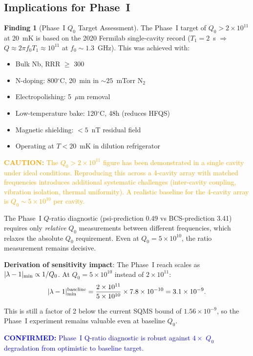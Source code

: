 \documentclass[11pt]{article}
\theoremstyle{definition}
\newtheorem{finding}[theorem]{Finding}
\theoremstyle{remark}
\newcommand{\ee}[1]{\times 10^{#1}}
\newcommand{\lam}{|\lambda-1|}
\newcommand{\confirmed}[1]{\textcolor{blue}{\textbf{CONFIRMED:} #1}}
\newcommand{\caution}[1]{\textcolor{orange}{\textbf{CAUTION:} #1}}
\begin{document}
\subsection{Implications for Phase~I}

\begin{finding}[Phase~I $Q_0$ Target Assessment]
\label{find:q0_target}
The Phase~I target of $Q_0 > 2\ee{11}$ at 20~mK is based on the
2020 Fermilab single-cavity record ($T_1 = 2$~s $\Rightarrow$
$Q \approx 2\pi f_0 T_1 \approx 10^{11}$ at $f_0 \sim 1.3$~GHz).
This was achieved with:
\begin{itemize}[nosep]
\item Bulk Nb, RRR $\geq$ 300
\item N-doping: 800$^\circ$C, 20~min in $\sim 25$~mTorr N$_2$
\item Electropolishing: 5~$\mu$m removal
\item Low-temperature bake: 120$^\circ$C, 48h (reduces HFQS)
\item Magnetic shielding: $< 5$~nT residual field
\item Operating at $T < 20$~mK in dilution refrigerator
\end{itemize}

\caution{The $Q_0 > 2\ee{11}$ figure has been demonstrated in a
single cavity under ideal conditions. Reproducing this across
a 4-cavity array with matched frequencies introduces additional
systematic challenges (inter-cavity coupling, vibration isolation,
thermal uniformity). A realistic baseline for the 4-cavity array
is $Q_0 \sim 5\ee{10}$ per cavity.}

The Phase~I $Q$-ratio diagnostic (psi-prediction 0.49 vs BCS-prediction
3.41) requires only \textit{relative} $Q_0$ measurements between
different frequencies, which relaxes the absolute $Q_0$ requirement.
Even at $Q_0 = 5\ee{10}$, the ratio measurement remains decisive.

\textbf{Derivation of sensitivity impact}: The Phase~I reach scales
as $\lam_{\rm min} \propto 1/Q_0$. At $Q_0 = 5\ee{10}$ instead
of $2\ee{11}$:
\begin{equation}
\lam_{\rm min}^{\rm baseline} = \frac{2\ee{11}}{5\ee{10}}
\times 7.8\ee{-10} = 3.1\ee{-9}.
\label{eq:degraded_reach}
\end{equation}

This is still a factor of 2 below the current SQMS bound of
$1.56\ee{-9}$, so the Phase~I experiment remains valuable even
at baseline $Q_0$.

\confirmed{Phase~I Q-ratio diagnostic is robust against $4\times$
$Q_0$ degradation from optimistic to baseline target.}
\end{finding}
\end{document}
